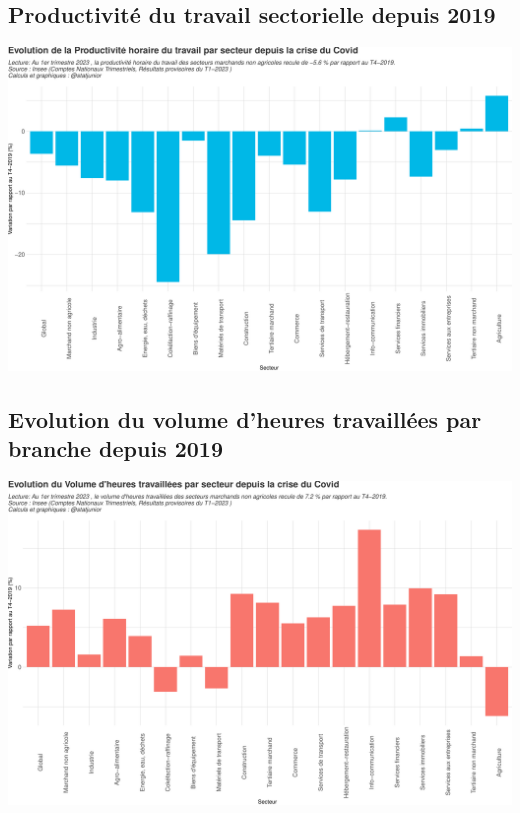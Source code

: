 \documentclass[
  paper=a4,
  ,captions=tableheading
]{scrartcl}
\begin{document}
\hypertarget{productivituxe9-du-travail-sectorielle-depuis-2019}{%
\subsection{Productivité du travail sectorielle depuis
2019}\label{productivituxe9-du-travail-sectorielle-depuis-2019}}

\includegraphics{rapport_pdf_compte_branche_files/figure-latex/unnamed-chunk-18-1.pdf}

\hypertarget{evolution-du-volume-dheures-travailluxe9es-par-branche-depuis-2019}{%
\subsection{Evolution du volume d'heures travaillées par branche depuis
2019}\label{evolution-du-volume-dheures-travailluxe9es-par-branche-depuis-2019}}

\includegraphics{rapport_pdf_compte_branche_files/figure-latex/unnamed-chunk-19-1.pdf}
\end{document}
